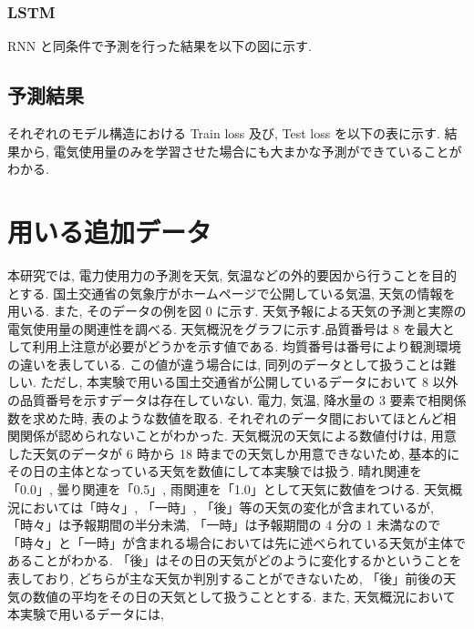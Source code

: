 \subsubsection{LSTM}
RNN と同条件で予測を行った結果を以下の図に示す.



\subsection{予測結果}
それぞれのモデル構造における Train loss 及び, Test loss を以下の表に示す.
結果から, 電気使用量のみを学習させた場合にも大まかな予測ができていることがわかる.


\section{用いる追加データ}
本研究では, 電力使用力の予測を天気, 気温などの外的要因から行うことを目的とする.
国土交通省の気象庁がホームページで公開している気温, 天気の情報を用いる.
また, そのデータの例を図 0 に示す. 天気予報による天気の予測と実際の電気使用量の関連性を調べる. 天気概況をグラフに示す.品質番号は 8 を最大として利用上注意が必要がどうかを示す値である. 均質番号は番号により観測環境の違いを表している. この値が違う場合には, 同列のデータとして扱うことは難しい. ただし, 本実験で用いる国土交通省が公開しているデータにおいて 8 以外の品質番号を示すデータは存在していない.
電力, 気温, 降水量の 3 要素で相関係数を求めた時, 表のような数値を取る.
それぞれのデータ間においてほとんど相関関係が認められないことがわかった.
天気概況の天気による数値付けは, 用意した天気のデータが 6 時から 18 時までの天気しか用意できないため, 基本的にその日の主体となっている天気を数値にして本実験では扱う.
晴れ関連を「0.0」, 曇り関連を「0.5」, 雨関連を「1.0」として天気に数値をつける.
天気概況においては「時々」, 「一時」, 「後」等の天気の変化が含まれているが, 「時々」は予報期間の半分未満, 「一時」は予報期間の 4 分の 1 未満なので「時々」と「一時」が含まれる場合においては先に述べられている天気が主体であることがわかる.
「後」はその日の天気がどのように変化するかということを表しており, どちらが主な天気か判別することができないため, 「後」前後の天気の数値の平均をその日の天気として扱うこととする.
また, 天気概況において本実験で用いるデータには, 

